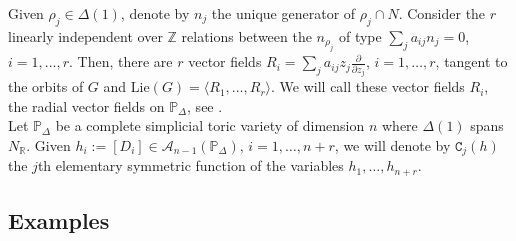\documentclass[11pt]{amsart}
\theoremstyle{plain}
\theoremstyle{definition}
\begin{document}
Given $\rho_j\in\Delta(1)$, denote by $n_j$ the unique generator of $\rho_j\cap N$. 
Consider the $r$ linearly independent over $\mathbb{Z}$ relations between the $n_{\rho_j}$ 
of type $\sum_ja_{ij} n_j=0$, $i=1,\ldots,r$. 
Then, there are $r$ vector fields $R_i=\sum_ja_{ij}z_j\frac{\partial}{\partial z_j}$, $i=1,\ldots,r$, 
tangent to the orbits of $G$ and $\mathrm{Lie}(G)=\langle R_1,\dots,R_r\rangle$. 
We will call these vector fields $R_i$, the radial vector fields on $\mathbb{P}_{\Delta}$, see \cite{Cox1}. \\

Let $\mathbb{P}_{\Delta}$ be a complete simplicial toric variety  of dimension $n$ where $\Delta(1)$
spans $N_{\mathbb{R}}$. Given $h_i:=\left[D_i\right]\in\mathcal{A}_{n-1}(\mathbb{P}_{\Delta})$, $i=1,\ldots,n+r$, we will denote by 
$\texttt{C}_{j}(h)$ the $j$th elementary symmetric function of the variables $h_1,\ldots, h_{n+r}$. 

\subsection{Examples}
\end{document}
